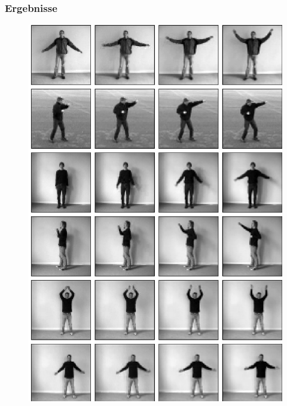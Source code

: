 \begin{frame}
\frametitle{Ergebnisse}
\begin{figure}[h!]
	\begin{minipage}[position=l]{0.4\textwidth}
			\includegraphics[scale=0.3]{Bilder/movies_input}
	\end{minipage}
	\begin{minipage}[position=r]{0.4\textwidth}

\end{minipage}
\end{figure}
\end{frame}

